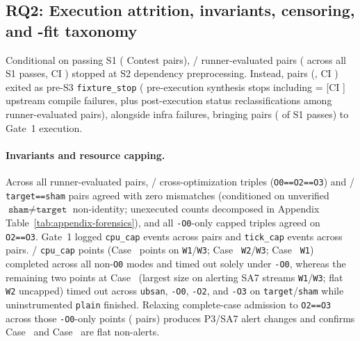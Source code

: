 \documentclass[11pt]{article}
\newcommand{\CaseRef}[1]{Case~#1}
\begin{document}
\subsection{RQ2: Execution attrition, invariants, censoring, and \BenchFittedClusters{}-fit taxonomy}
\label{sec:rq2}

Conditional on passing S1 (\BenchConfSTwoPassN{} Contest pairs), \BenchFlowPrepC{}/\BenchSAThreeDenom{} runner-evaluated pairs (\BenchSAThreeAllSPass{} across all \BenchConfSTwoPassN{} S1 passes, CI \BenchSAThreeAllSPassCI{}) stopped at S2 dependency preprocessing.
Instead, \BenchFixtureStopN{} pairs (\BenchFixtureStopPct{}, CI \BenchFixtureStopCI{}) exited as pre-S3 \texttt{fixture\_stop} (\BenchRunnerPreFixtureN{} pre-execution synthesis stops including \BenchOrigCompileFailN{} = \BenchOrigCompileFailPct{} [CI \BenchOrigCompileFailCI{}] upstream compile failures, plus \BenchRunnerOverlayFixtureN{} post-execution status reclassifications among \BenchRunnerSOnePassN{} runner-evaluated pairs), alongside \BenchInfraFailN{} infra failures, bringing \BenchPOneCount{} pairs (\BenchCondExecPct{} of S1 passes) to Gate~1 execution.

\paragraph{Invariants and resource capping.}
Across all \BenchRunnerSOnePassN{} runner-evaluated pairs, \BenchOZeroAgree{}/\BenchOZeroTotalTriples{} cross-optimization triples (\texttt{O0==O2==O3}) and \BenchShamAgree{}/\BenchShamTotalPairs{} \texttt{target==sham} pairs agreed with zero mismatches (conditioned on unverified $\texttt{sham} \neq \texttt{target}$ non-identity; unexecuted counts decomposed in Appendix Table~\ref{tab:appendix-forensics}), and all \BenchOZeroCapOtwoAgree{} \texttt{-O0}-only capped triples agreed on \texttt{O2==O3}.
Gate~1 logged \BenchCpuCapEvents{} \texttt{cpu\_cap} events across \BenchCpuCapPos{} pairs and \BenchTickCapEvents{} \texttt{tick\_cap} events across \BenchTickCapPos{} pairs.
\BenchCpuCapOZeroOnlyPts{}/\BenchCpuCapTotalPts{} \texttt{cpu\_cap} points (\CaseRef{\BenchPosNineZero{}} \BenchPosNineZeroOZeroOnlyPts{} points on \texttt{W1}/\texttt{W3}; \CaseRef{\BenchPosNineNine{}} \texttt{W2}/\texttt{W3}; \CaseRef{\BenchPosOneThreeNine{}} \texttt{W1}) completed across all non-\texttt{O0} modes and timed out solely under \texttt{-O0}, whereas the remaining two points at \CaseRef{\BenchPosNineZero{}} (largest size on alerting SA7 streams \texttt{W1}/\texttt{W3}; flat \texttt{W2} uncapped) timed out across \texttt{ubsan}, \texttt{-O0}, \texttt{-O2}, and \texttt{-O3} on \texttt{target}/\texttt{sham} while uninstrumented \texttt{plain} finished.
Relaxing complete-case admission to \texttt{O2==O3} across those \BenchOZeroRelaxCapPtsN{} \texttt{-O0}-only points (\BenchOZeroRelaxPairsN{} pairs) produces \BenchOZeroRelaxDeltaN{} P3/SA7 alert changes and confirms \CaseRef{\BenchPosNineNine{}} and \CaseRef{\BenchPosOneThreeNine{}} are flat non-alerts.
\end{document}
